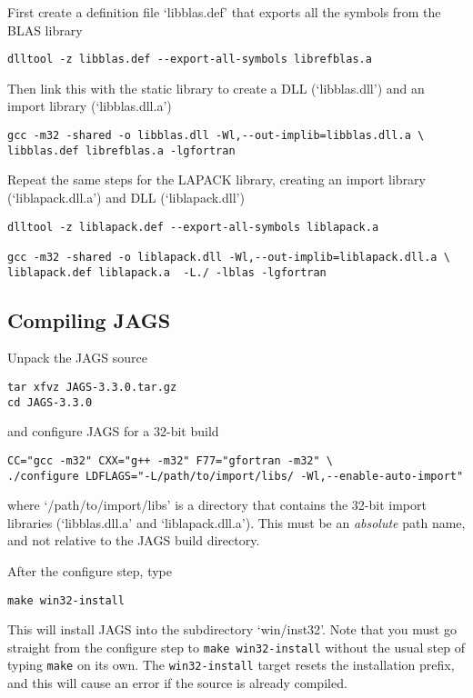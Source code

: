 \documentclass[11pt, a4paper, titlepage]{article}
\newcommand{\JAGS}{\textsf{JAGS}}
\newcommand{\file}[1]{{`\normalfont\textsf{#1}'}}
\begin{document}
First create a definition file \file{libblas.def} that exports all the
symbols from the BLAS library
\begin{verbatim}
dlltool -z libblas.def --export-all-symbols librefblas.a
\end{verbatim}
Then link this with the static library to create a DLL
(\file{libblas.dll}) and an import library (\file{libblas.dll.a})
\begin{verbatim}
gcc -m32 -shared -o libblas.dll -Wl,--out-implib=libblas.dll.a \
libblas.def librefblas.a -lgfortran
\end{verbatim}
 
Repeat the same steps for the LAPACK library, creating an import library
(\file{liblapack.dll.a}) and DLL (\file{liblapack.dll})
\begin{verbatim}
dlltool -z liblapack.def --export-all-symbols liblapack.a

gcc -m32 -shared -o liblapack.dll -Wl,--out-implib=liblapack.dll.a \
liblapack.def liblapack.a  -L./ -lblas -lgfortran
\end{verbatim}

\subsection{Compiling \JAGS}

Unpack the JAGS source
\begin{verbatim}
tar xfvz JAGS-3.3.0.tar.gz
cd JAGS-3.3.0
\end{verbatim}
and configure JAGS for a 32-bit build
\begin{verbatim}
CC="gcc -m32" CXX="g++ -m32" F77="gfortran -m32" \
./configure LDFLAGS="-L/path/to/import/libs/ -Wl,--enable-auto-import" 
\end{verbatim}
where \file{/path/to/import/libs} is a directory that contains the
32-bit import libraries (\file{libblas.dll.a} and
\file{liblapack.dll.a}).  This must be an {\em absolute} path name,
and not relative to the JAGS build directory.

After the configure step, type
\begin{verbatim}
make win32-install
\end{verbatim}
This will install JAGS into the subdirectory \file{win/inst32}.
Note that you must go straight from the configure step to \texttt{make
  win32-install} without the usual step of typing \texttt{make} on
its own.  The \texttt{win32-install} target resets the installation
prefix, and this will cause an error if the source is already
compiled.
\end{document}
